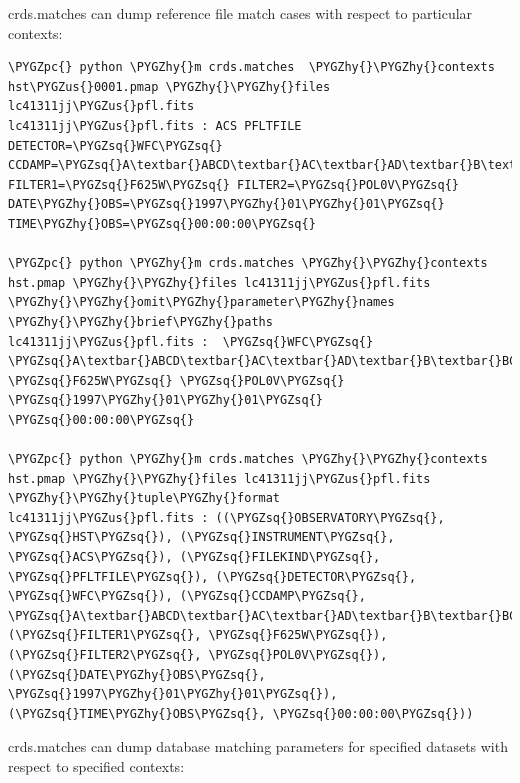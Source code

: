 \documentclass[letterpaper,10pt,english]{sphinxmanual}
\def\PYGZus{\char`\_}
\def\PYGZpc{\char`\%}
\def\PYGZhy{\char`\-}
\def\PYGZsq{\char`\'}
\renewcommand\PYGZsq{\textquotesingle}
\begin{document}
crds.matches can dump reference file match cases with respect to particular contexts:

\begin{Verbatim}[commandchars=\\\{\}]
\PYGZpc{} python \PYGZhy{}m crds.matches  \PYGZhy{}\PYGZhy{}contexts hst\PYGZus{}0001.pmap \PYGZhy{}\PYGZhy{}files lc41311jj\PYGZus{}pfl.fits
lc41311jj\PYGZus{}pfl.fits : ACS PFLTFILE DETECTOR=\PYGZsq{}WFC\PYGZsq{} CCDAMP=\PYGZsq{}A\textbar{}ABCD\textbar{}AC\textbar{}AD\textbar{}B\textbar{}BC\textbar{}BD\textbar{}C\textbar{}D\PYGZsq{} FILTER1=\PYGZsq{}F625W\PYGZsq{} FILTER2=\PYGZsq{}POL0V\PYGZsq{} DATE\PYGZhy{}OBS=\PYGZsq{}1997\PYGZhy{}01\PYGZhy{}01\PYGZsq{} TIME\PYGZhy{}OBS=\PYGZsq{}00:00:00\PYGZsq{}

\PYGZpc{} python \PYGZhy{}m crds.matches \PYGZhy{}\PYGZhy{}contexts hst.pmap \PYGZhy{}\PYGZhy{}files lc41311jj\PYGZus{}pfl.fits \PYGZhy{}\PYGZhy{}omit\PYGZhy{}parameter\PYGZhy{}names \PYGZhy{}\PYGZhy{}brief\PYGZhy{}paths
lc41311jj\PYGZus{}pfl.fits :  \PYGZsq{}WFC\PYGZsq{} \PYGZsq{}A\textbar{}ABCD\textbar{}AC\textbar{}AD\textbar{}B\textbar{}BC\textbar{}BD\textbar{}C\textbar{}D\PYGZsq{} \PYGZsq{}F625W\PYGZsq{} \PYGZsq{}POL0V\PYGZsq{} \PYGZsq{}1997\PYGZhy{}01\PYGZhy{}01\PYGZsq{} \PYGZsq{}00:00:00\PYGZsq{}

\PYGZpc{} python \PYGZhy{}m crds.matches \PYGZhy{}\PYGZhy{}contexts hst.pmap \PYGZhy{}\PYGZhy{}files lc41311jj\PYGZus{}pfl.fits \PYGZhy{}\PYGZhy{}tuple\PYGZhy{}format
lc41311jj\PYGZus{}pfl.fits : ((\PYGZsq{}OBSERVATORY\PYGZsq{}, \PYGZsq{}HST\PYGZsq{}), (\PYGZsq{}INSTRUMENT\PYGZsq{}, \PYGZsq{}ACS\PYGZsq{}), (\PYGZsq{}FILEKIND\PYGZsq{}, \PYGZsq{}PFLTFILE\PYGZsq{}), (\PYGZsq{}DETECTOR\PYGZsq{}, \PYGZsq{}WFC\PYGZsq{}), (\PYGZsq{}CCDAMP\PYGZsq{}, \PYGZsq{}A\textbar{}ABCD\textbar{}AC\textbar{}AD\textbar{}B\textbar{}BC\textbar{}BD\textbar{}C\textbar{}D\PYGZsq{}), (\PYGZsq{}FILTER1\PYGZsq{}, \PYGZsq{}F625W\PYGZsq{}), (\PYGZsq{}FILTER2\PYGZsq{}, \PYGZsq{}POL0V\PYGZsq{}), (\PYGZsq{}DATE\PYGZhy{}OBS\PYGZsq{}, \PYGZsq{}1997\PYGZhy{}01\PYGZhy{}01\PYGZsq{}), (\PYGZsq{}TIME\PYGZhy{}OBS\PYGZsq{}, \PYGZsq{}00:00:00\PYGZsq{}))
\end{Verbatim}

crds.matches can dump database matching parameters for specified datasets with respect to specified contexts:
\end{document}
